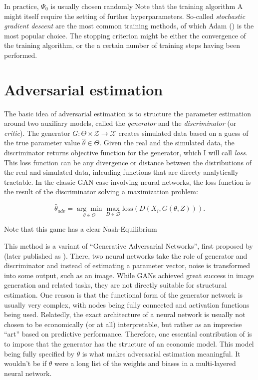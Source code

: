 In practice, $\Psi_0$ is usually chosen randomly
Note that the training algorithm A might itself require the setting of further hyperparameters.
So-called \textit{stochastic gradient descent} are the most common training methods, of which Adam (\cite{diederik2014adam}) is the most popular choice. %
The stopping criterion might be either the convergence of the training algorithm, or the a certain number of training steps having been performed.

\section{Adversarial estimation}
\label{sec:adversarial_estimation}

The basic idea of adversarial estimation is to structure the parameter estimation around two auxiliary models, called the \textit{generator} and the \textit{discriminator} (or \textit{critic}).
The generator $G : \Theta \times \mathcal{Z} \rightarrow \mathcal{X}$ creates simulated data based on a guess of the true parameter value $\hat{\theta} \in \Theta$.
Given the real and the simulated data, the discriminator returns objective function for the generator, which I will call \textit{loss}.
This loss function can be any divergence or distance between the distributions of the real and simulated data, inlcuding functions that are directy analytically tractable.
In the classic GAN case involving neural networks, the loss function is the result of the discriminator solving a maximization problem:

\begin{equation}
\label{eq:adversarial_estimator}
    \hat{\theta}_{adv} = \underset{\theta \in \Theta}{\arg \min } \max _{D \in \mathcal{D}} \text{loss}(D(X_i, G(\theta, Z))).
\end{equation}

Note that this game has a clear Nash-Equilibrium

This method is a variant of ``Generative Adversarial Networks'', first proposed by \textcite{goodfellow2014generative} (later published as \textcite{goodfellow2020generative}).
There, two neural networks take the role of generator and discriminator and instead of estimating a parameter vector, noise is transformed into some output, such as an image.
While GANs achieved great success in image generation and related tasks, %
they are not directly suitable for structural estimation.
One reason is that the functional form of the generator network is usually very complex, with nodes being fully connected and activation functions being used.
Relatedly, the exact architecture of a neural network is usually not chosen to be economically (or at all) interpretable, but rather as an imprecise ``art'' based on predictive performance.
Therefore, one essential contribution of \textcite{kaji2023adversarial} is to impose that the generator has the structure of an economic model.
This model being fully specified by $\theta$ is what makes adversarial estimation meaningful.
It wouldn't be if $\theta$ were a long list of the weights and biases in a multi-layered neural network.

